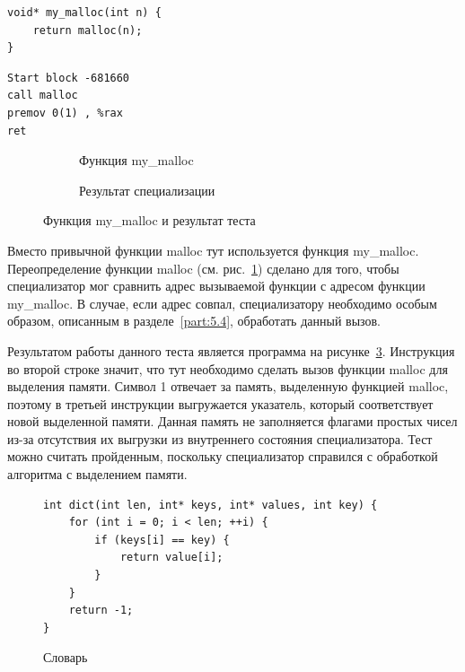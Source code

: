 \newsavebox\boxel
\begin{lrbox}{\boxel}
\begin{lstlisting}[xleftmargin = 20pt]
void* my_malloc(int n) {
    return malloc(n);
}
\end{lstlisting}
\end{lrbox}

\newsavebox\boxtw
\begin{lrbox}{\boxtw}
\begin{lstlisting}[xleftmargin = 20pt]
Start block -681660
call malloc
premov 0(1) , %rax 
ret
\end{lstlisting}
\end{lrbox}

\begin{figure}[!t]
\centering
    	\begin{subfigure}[b]{0.5\textwidth}
	    \centering
        \usebox\boxel
        \caption{Функция my\_malloc\label{fig:mymalloc}}
    \end{subfigure}
    	\begin{subfigure}[b]{0.5\textwidth}
	    \centering
        \usebox\boxtw
        \caption{Результат специализации\label{fig:erares}}
    \end{subfigure}
\caption{Функция my\_malloc и результат теста}
\end{figure}

Вместо привычной функции \textsf{malloc} тут используется функция \textsf{my\_malloc}.
Переопределение функции \textsf{malloc} (см. рис.~\ref{fig:mymalloc}) сделано для того, чтобы специализатор мог сравнить адрес
вызываемой функции с адресом функции \textsf{my\_malloc}.
В случае, если адрес совпал, специализатору необходимо особым образом, описанным в разделе~\ref{part:5.4}, обработать данный вызов.

Результатом работы данного теста является программа на рисунке~\ref{fig:erares}.
Инструкция во второй строке значит, что тут необходимо сделать вызов функции \textsf{malloc} для выделения памяти.
Символ \textsf{1} отвечает за память, выделенную функцией \textsf{malloc}, поэтому в третьей инструкции выгружается указатель,
который соответствует новой выделенной памяти.
Данная память не заполняется флагами простых чисел из-за отсутствия их выгрузки из внутреннего состояния специализатора.
Тест можно считать пройденным, поскольку специализатор справился с обработкой алгоритма с выделением памяти.

\begin{figure}[t]
\begin{lstlisting}[xleftmargin = 20pt]
int dict(int len, int* keys, int* values, int key) {
    for (int i = 0; i < len; ++i) {
        if (keys[i] == key) {
            return value[i];
        }
    }
    return -1;
}
\end{lstlisting}
\caption{ Словарь}
\label{fig:dict}
\end{figure}

